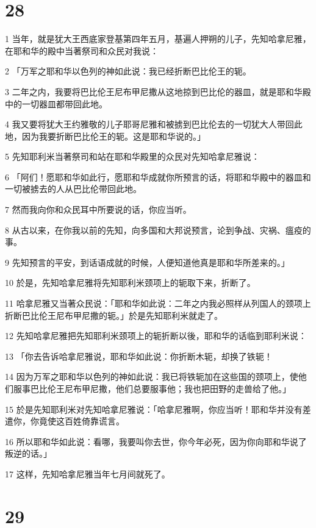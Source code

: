 \chapter{28}

\par 1 当年，就是犹大王西底家登基第四年五月，基遍人押朔的儿子，先知哈拿尼雅，在耶和华的殿中当著祭司和众民对我说：
\par 2 「万军之耶和华以色列的神如此说：我已经折断巴比伦王的轭。
\par 3 二年之内，我要将巴比伦王尼布甲尼撒从这地掠到巴比伦的器皿，就是耶和华殿中的一切器皿都带回此地。
\par 4 我又要将犹大王约雅敬的儿子耶哥尼雅和被掳到巴比伦去的一切犹大人带回此地，因为我要折断巴比伦王的轭。这是耶和华说的。」
\par 5 先知耶利米当著祭司和站在耶和华殿里的众民对先知哈拿尼雅说：
\par 6 「阿们！愿耶和华如此行，愿耶和华成就你所预言的话，将耶和华殿中的器皿和一切被掳去的人从巴比伦带回此地。
\par 7 然而我向你和众民耳中所要说的话，你应当听。
\par 8 从古以来，在你我以前的先知，向多国和大邦说预言，论到争战、灾祸、瘟疫的事。
\par 9 先知预言的平安，到话语成就的时候，人便知道他真是耶和华所差来的。」
\par 10 於是，先知哈拿尼雅将先知耶利米颈项上的轭取下来，折断了。
\par 11 哈拿尼雅又当著众民说：「耶和华如此说：二年之内我必照样从列国人的颈项上折断巴比伦王尼布甲尼撒的轭。」於是先知耶利米就走了。
\par 12 先知哈拿尼雅把先知耶利米颈项上的轭折断以後，耶和华的话临到耶利米说：
\par 13 「你去告诉哈拿尼雅说，耶和华如此说：你折断木轭，却换了铁轭！
\par 14 因为万军之耶和华以色列的神如此说：我已将铁轭加在这些国的颈项上，使他们服事巴比伦王尼布甲尼撒，他们总要服事他；我也把田野的走兽给了他。」
\par 15 於是先知耶利米对先知哈拿尼雅说：「哈拿尼雅啊，你应当听！耶和华并没有差遣你，你竟使这百姓倚靠谎言。
\par 16 所以耶和华如此说：看哪，我要叫你去世，你今年必死，因为你向耶和华说了叛逆的话。」
\par 17 这样，先知哈拿尼雅当年七月间就死了。

\chapter{29}

